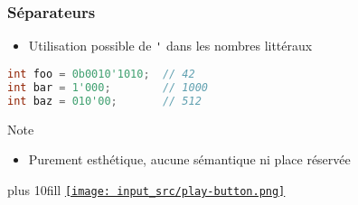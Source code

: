 \documentclass[C++.tex]{subfiles}
\begin{document}
\begin{frame}[fragile]
	\frametitle{Séparateurs}
	\begin{itemize}
		\item Utilisation possible de \lstinline|'| dans les nombres littéraux
	\end{itemize}

	\begin{lstlisting}[language=C++]
int foo = 0b0010'1010;  // 42
int bar = 1'000;        // 1000
int baz = 010'00;       // 512\end{lstlisting}

	\begin{block}{Note}
		\begin{itemize}
			\item Purement esthétique, aucune sémantique ni place réservée
		\end{itemize}
	\end{block}

	\vskip 10mm plus 10fill
	\hfill
	\href{https://godbolt.org/#g:!((g:!((g:!((h:codeEditor,i:(filename:'1',fontScale:14,fontUsePx:'0',j:1,lang:c%2B%2B,selection:(endColumn:1,endLineNumber:8,positionColumn:1,positionLineNumber:8,selectionStartColumn:1,selectionStartLineNumber:5,startColumn:1,startLineNumber:5),source:'%23include+%3Ciostream%3E%0A%0Aint+main()%0A%7B%0A++std::cout+%3C%3C+0b0010!'1010+%3C%3C+!'%5Cn!'%3B%0A++std::cout+%3C%3C+1!'000+%3C%3C+!'%5Cn!'%3B%0A++std::cout+%3C%3C+010!'00+%3C%3C+!'%5Cn!'%3B%0A%7D%0A'),l:'5',n:'0',o:'C%2B%2B+source+%231',t:'0')),k:50,l:'4',n:'0',o:'',s:0,t:'0'),(g:!((h:executor,i:(argsPanelShown:'1',compilationPanelShown:'0',compiler:g122,compilerName:'',compilerOutShown:'0',execArgs:'',execStdin:'',fontScale:14,fontUsePx:'0',j:1,lang:c%2B%2B,libs:!((name:boost,ver:'175')),options:'-std%3Dc%2B%2B14+-Wall+-Wextra',source:1,stdinPanelShown:'1',tree:'1',wrap:'0'),l:'5',n:'0',o:'Executor+x86-64+gcc+12.2+(C%2B%2B,+Editor+%231)',t:'0')),header:(),k:50,l:'4',n:'0',o:'',s:0,t:'0')),l:'2',n:'0',o:'',t:'0')),version:4}{\texttt{[image: input\_src/play-button.png]}}
\end{frame}
\end{document}
